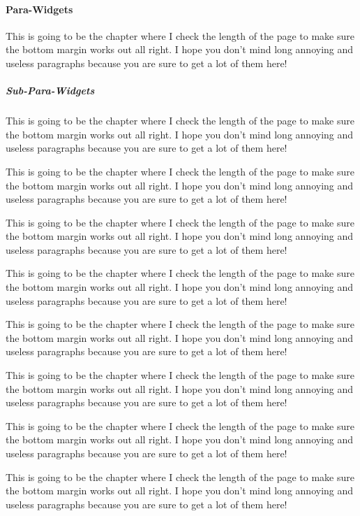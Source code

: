 \paragraph{Para-Widgets}

This is going to be the chapter where I check the length of the page
to make sure the bottom margin works out all right.  I hope you don't
mind long annoying and useless paragraphs because you are sure to get
a lot of them here!

\subparagraph{Sub-Para-Widgets}

This is going to be the chapter where I check the length of the page
to make sure the bottom margin works out all right.  I hope you don't
mind long annoying and useless paragraphs because you are sure to get
a lot of them here!

This is going to be the chapter where I check the length of the page
to make sure the bottom margin works out all right.  I hope you don't
mind long annoying and useless paragraphs because you are sure to get
a lot of them here!

This is going to be the chapter where I check the length of the page
to make sure the bottom margin works out all right.  I hope you don't
mind long annoying and useless paragraphs because you are sure to get
a lot of them here!

This is going to be the chapter where I check the length of the page
to make sure the bottom margin works out all right.  I hope you don't
mind long annoying and useless paragraphs because you are sure to get
a lot of them here!

This is going to be the chapter where I check the length of the page
to make sure the bottom margin works out all right.  I hope you don't
mind long annoying and useless paragraphs because you are sure to get
a lot of them here!

This is going to be the chapter where I check the length of the page
to make sure the bottom margin works out all right.  I hope you don't
mind long annoying and useless paragraphs because you are sure to get
a lot of them here!

This is going to be the chapter where I check the length of the page
to make sure the bottom margin works out all right.  I hope you don't
mind long annoying and useless paragraphs because you are sure to get
a lot of them here!

This is going to be the chapter where I check the length of the page
to make sure the bottom margin works out all right.  I hope you don't
mind long annoying and useless paragraphs because you are sure to get
a lot of them here!


